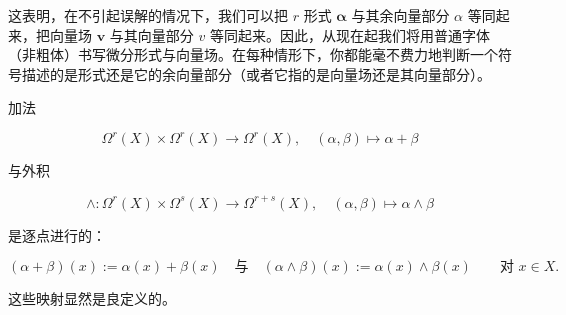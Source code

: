 这表明，在不引起误解的情况下，我们可以把 $ r $ 形式 $ \boldsymbol{\alpha} $ 与其余向量部分 $ \alpha $ 等同起来，把向量场 $ \boldsymbol{v} $ 与其向量部分 $ v $ 等同起来。因此，从现在起我们将用普通字体（非粗体）书写微分形式与向量场。在每种情形下，你都能毫不费力地判断一个符号描述的是形式还是它的余向量部分（或者它指的是向量场还是其向量部分）。

加法

\[
\Omega^{r}(X) \times \Omega^{r}(X) \to \Omega^{r}(X), \quad (\alpha,\beta) \mapsto \alpha+\beta
\]

与外积

\[
\wedge: \Omega^{r}(X) \times \Omega^{s}(X) \to \Omega^{r+s}(X), \quad (\alpha,\beta) \mapsto \alpha \wedge \beta
\]

是逐点进行的：

\[
(\alpha+\beta)(x) := \alpha(x)+\beta(x) \quad \text{与} \quad (\alpha \wedge \beta)(x) := \alpha(x) \wedge \beta(x) \qquad \text{对 } x \in X.
\]

这些映射显然是良定义的。

